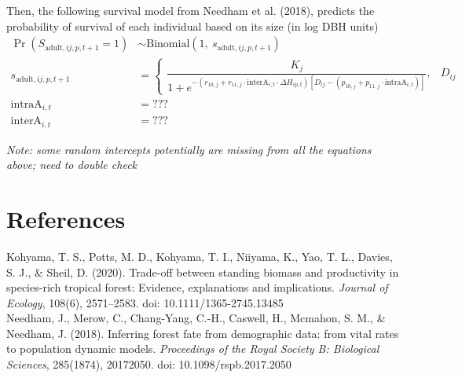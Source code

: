 \documentclass[12pt,a4paper]{article}
\begin{document}
Then, the following survival model from Needham et al. (2018), predicts the probability of survival of each individual based on its size (in log DBH units)
\begin{align}
\Pr(S_{\text{adult},ij,p,t+1} = 1) &\sim \text{Binomial}(1,~s_{\text{adult},ij,p,t+1}) \\
s_{\text{adult},ij,p,t+1} &=
\begin{cases}
    \dfrac{K_j}{1 + e^{-(r_{10,j} + r_{11,j} \cdot \text{interA}_{i,t} \cdot \Delta H_{ip,t}) [D_{ij} - (p_{10,j} + p_{11,j} \cdot \text{intraA}_{i,t}) ]}}, & D_{ij}
\end{cases} \\
\text{intraA}_{i,t} &= ??? \\
\text{interA}_{i,t} &= ???
\end{align}


\textit{Note: some random intercepts potentially are missing from all the equations above; need to double check}

\section{References}

\noindent Kohyama, T. S., Potts, M. D., Kohyama, T. I., Niiyama, K., Yao, T. L., Davies, S. J., \& Sheil, D. (2020). Trade-off between standing biomass and productivity in species-rich tropical forest: Evidence, explanations and implications. \textit{Journal of Ecology}, 108(6), 2571–2583. doi: 10.1111/1365-2745.13485
\\

\noindent Needham, J., Merow, C., Chang-Yang, C.-H., Caswell, H., Mcmahon, S. M., \& Needham, J. (2018). Inferring forest fate from demographic data: from vital rates to population dynamic models. \textit{Proceedings of the Royal Society B: Biological Sciences}, 285(1874), 20172050. doi: 10.1098/rspb.2017.2050
\end{document}
